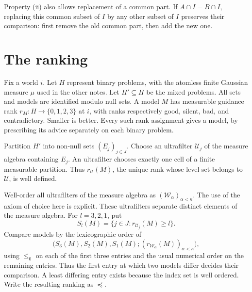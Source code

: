 \documentclass[11pt]{article}
\theoremstyle{remark}\newtheorem{remark}[theorem]{Remark}
\newcommand{\U}{\mathcal U}
\newcommand{\W}{\mathcal W}
\begin{document}
Property (ii) also allows replacement of a common part. If
$A\cap I=B\cap I$, replacing this common subset of $I$ by any other
subset of $I$ preserves their comparison: first remove the old common
part, then add the new one.

\section{The ranking}

Fix a world $i$. Let $H$ represent binary problems, with the atomless
finite Gaussian measure $\mu$ used in the other notes. Let $H'\subseteq H$
be the mixed problems. All sets and models are identified modulo null
sets. A model $M$ has measurable guidance rank
$r_M:H\to\{0,1,2,3\}$ at $i$, with ranks respectively good, silent, bad,
and contradictory. Smaller is better. Every such rank assignment gives
a model, by prescribing its advice separately on each binary problem.

Partition $H'$ into non-null sets $(E_j)_{j\in J}$. Choose an ultrafilter
$\U_j$ of the measure algebra containing $E_j$. An ultrafilter chooses
exactly one cell of a finite measurable partition. Thus $r_{\U}(M)$,
the unique rank whose level set belongs to $\U$, is well defined.

Well-order all ultrafilters of the measure algebra as
$(\W_\alpha)_{\alpha<\kappa}$. The use of the axiom of choice here is
explicit. These ultrafilters separate distinct elements of the measure
algebra. For $l=3,2,1$, put
\[
 S_l(M)=\{j\in J:r_{\U_j}(M)\ge l\}.
\]
Compare models by the lexicographic order of
\begin{equation}
 \bigl(S_3(M),S_2(M),S_1(M);
                (r_{\W_\alpha}(M))_{\alpha<\kappa}\bigr),       \label{eq:order}
\end{equation}
using $\le_0$ on each of the first three entries and the usual numerical
order on the remaining entries. Thus the first entry at which two
models differ decides their comparison. A least differing entry exists
because the index set is well ordered. Write the resulting ranking as
$\preceq$.
\end{document}
